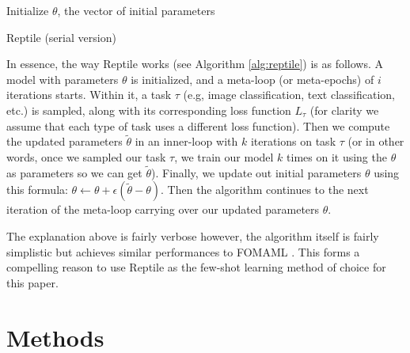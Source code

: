 \documentclass[a4paper]{book}
\begin{document}
\IncMargin{1em}
\begin{algorithm}
Initialize $\theta$, the vector of initial parameters


\caption{Reptile (serial version)}
\label{alg:reptile}
\end{algorithm}
\DecMargin{1em}

In essence, the way Reptile works (see Algorithm \ref{alg:reptile}) is as follows. A model with parameters $\theta$ is initialized, and a meta-loop (or meta-epochs) of $i$ iterations starts. Within it, a task $\tau$ (e.g, image classification, text classification, etc.) is sampled, along with its corresponding loss function $L_{\tau}$ (for clarity we assume that each type of task uses a different loss function). Then we compute the updated parameters $\tilde \theta$ in an inner-loop with $k$ iterations on task $\tau$ (or in other words, once we sampled our task $\tau$, we train our model $k$ times on it using the $\theta$ as parameters so we can get $\tilde \theta$). Finally, we update out initial parameters $\theta$ using this formula: $\theta \leftarrow \theta + \epsilon (\tilde{\theta} - \theta)$. Then the algorithm continues to the next iteration of the meta-loop carrying over our updated parameters $\theta$.

The explanation above is fairly verbose however, the algorithm itself is fairly simplistic but achieves similar performances to FOMAML \parencite{nichol_first-order_2018}. This forms a compelling reason to use Reptile as the few-shot learning method of choice for this paper.

\chapter{Methods}\label{chap:methods}
\end{document}

